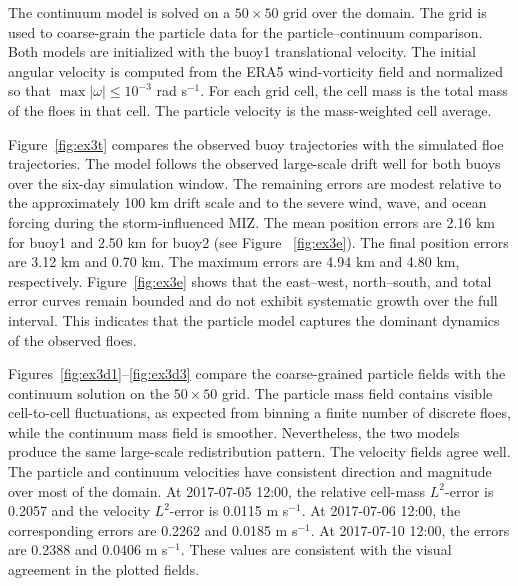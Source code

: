 \documentclass[a4paper,11pt]{article}
\numberwithin{equation}{section}
\theoremstyle{definition}
\begin{document}
The continuum model is solved on a $50\times50$ grid over the domain.  
The grid is used to coarse-grain the particle data for the particle--continuum comparison.  Both models are initialized with the buoy1 translational velocity.  The initial angular velocity is computed from the ERA5 wind-vorticity field and normalized so that $\max |\omega|\le 10^{-3}$ rad s$^{-1}$.  For each grid cell, the cell mass is the total mass of the floes in that cell.  The particle velocity is the mass-weighted cell average.


Figure~\ref{fig:ex3t} compares the observed buoy trajectories with the simulated floe trajectories.  The model follows the observed large-scale drift well for both buoys over the six-day simulation window.  The remaining errors are modest relative to the approximately 100 km drift scale and to the severe wind, wave, and ocean forcing during the storm-influenced MIZ.  The mean position errors are 2.16 km for buoy1 and 2.50 km for buoy2 (see Figure ~\ref{fig:ex3e}). The final position errors are 3.12 km and 0.70 km. The maximum errors are 4.94 km and 4.80 km, respectively.  
Figure~\ref{fig:ex3e} shows that the east--west, north--south, and total error curves remain bounded and do not exhibit systematic growth over the full interval.  This indicates that the particle model captures the dominant dynamics of the observed floes.


Figures~\ref{fig:ex3d1}--\ref{fig:ex3d3} compare the coarse-grained particle fields with the continuum solution on the $50\times50$ grid. The particle mass field contains visible cell-to-cell fluctuations, as expected from binning a finite number of discrete floes, while the continuum mass field is smoother.  Nevertheless, the two models produce the same large-scale redistribution pattern.  The velocity fields agree well. The particle and continuum velocities have consistent direction and magnitude over most of the domain.
At 2017-07-05 12:00, the relative cell-mass $L^2$-error is 0.2057 and the velocity $L^2$-error is 0.0115 m s$^{-1}$.  At 2017-07-06 12:00, the corresponding errors are 0.2262 and 0.0185 m s$^{-1}$.  At 2017-07-10 12:00, the errors are 0.2388 and 0.0406 m s$^{-1}$. These values are consistent with the visual agreement in the plotted fields.
\end{document}
